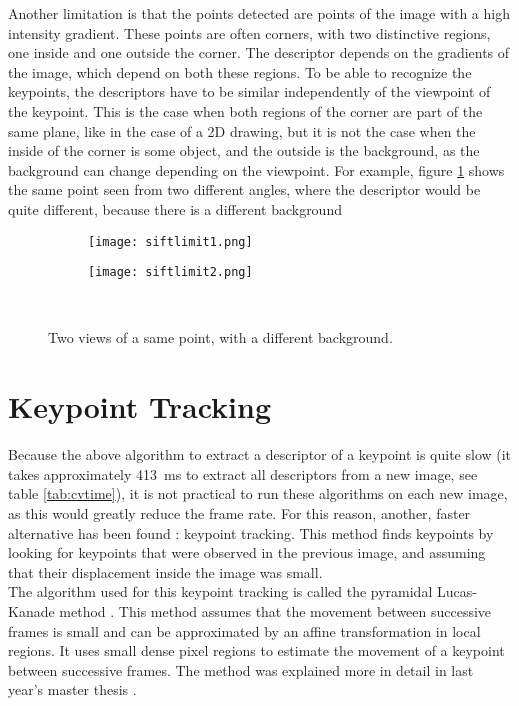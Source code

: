 Another limitation is that the points detected are points of the image with a high intensity gradient. These points are often corners, with two distinctive regions, one inside and one outside the corner. The descriptor depends on the gradients of the image, which depend on both these regions. To be able to recognize the keypoints, the descriptors have to be similar independently of the viewpoint of the keypoint. This is the case when both regions of the corner are part of the same plane, like in the case of a 2D drawing, but it is not the case when the inside of the corner is some object, and the outside is the background, as the background can change depending on the viewpoint. For example, figure \ref{fig:siftlimit} shows the same point seen from two different angles, where the descriptor would be quite different, because there is a different background
\begin{figure}[H]
\centering
\begin{subfigure}{.4\textwidth}
  \centering
  \texttt{[image: siftlimit1.png]}
\end{subfigure}%
\begin{subfigure}{.4\textwidth}
  \centering
  \texttt{[image: siftlimit2.png]}
\end{subfigure} \\
\caption{Two views of a same point, with a different background.}
\label{fig:siftlimit}
\end{figure}

\section{Keypoint Tracking}
Because the above algorithm to extract a descriptor of a keypoint is quite slow (it takes approximately \SI{413}{\milli\second} to extract all descriptors from a new image, see table \ref{tab:cvtime}), it is not practical to run these algorithms on each new image, as this would greatly reduce the frame rate. For this reason, another, faster alternative has been found : keypoint tracking. This method finds keypoints by looking for keypoints that were observed in the previous image, and assuming that their displacement inside the image was small. \\

The algorithm used for this keypoint tracking is called the pyramidal Lucas-Kanade method \cite{pyramidallucaskanade}. This method assumes that the movement between successive frames is small and can be approximated by an affine transformation in local regions. It uses small dense pixel regions to estimate the movement of a keypoint between successive frames. The method was explained more in detail in last year's master thesis \cite{jacquesleclere}.\\


